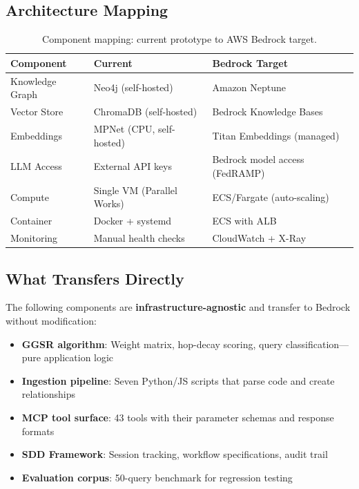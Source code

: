 \documentclass[11pt,letterpaper]{article}
\begin{document}
\subsection{Architecture Mapping}

\begin{table}[H]
\centering
\caption{Component mapping: current prototype to AWS Bedrock target.}
\label{tab:mapping}
\begin{tabular}{@{}lll@{}}
\toprule
\textbf{Component} & \textbf{Current} & \textbf{Bedrock Target} \\
\midrule
Knowledge Graph & Neo4j (self-hosted) & Amazon Neptune~\cite{aws_neptune2024} \\
Vector Store    & ChromaDB (self-hosted) & Bedrock Knowledge Bases \\
Embeddings      & MPNet (CPU, self-hosted) & Titan Embeddings (managed) \\
LLM Access      & External API keys & Bedrock model access (FedRAMP) \\
Compute         & Single VM (Parallel Works) & ECS/Fargate (auto-scaling) \\
Container       & Docker + systemd & ECS with ALB \\
Monitoring      & Manual health checks & CloudWatch + X-Ray \\
\bottomrule
\end{tabular}
\end{table}

\subsection{What Transfers Directly}

The following components are \textbf{infrastructure-agnostic} and transfer
to Bedrock without modification:

\begin{itemize}[nosep]
    \item \textbf{GGSR algorithm}: Weight matrix, hop-decay scoring,
          query classification---pure application logic
    \item \textbf{Ingestion pipeline}: Seven Python/JS scripts that
          parse code and create relationships
    \item \textbf{MCP tool surface}: 43 tools with their parameter
          schemas and response formats
    \item \textbf{SDD Framework}: Session tracking, workflow
          specifications, audit trail
    \item \textbf{Evaluation corpus}: 50-query benchmark for regression
          testing
\end{itemize}
\end{document}
